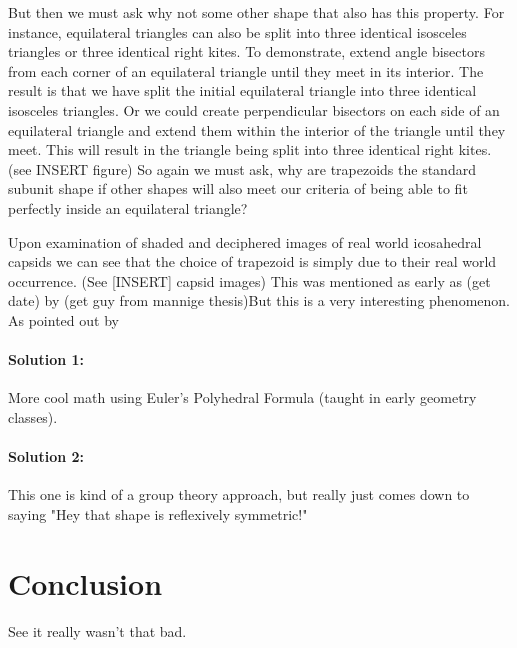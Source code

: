 \documentclass[12pt,letter]{article}
\begin{document}
But then we must ask why not some other shape that also has this property. For instance, equilateral triangles can also be split into three identical isosceles triangles or three identical right kites. To demonstrate, extend angle bisectors from each corner of an equilateral triangle until they meet in its interior. The result is that we have split the initial equilateral triangle into three identical isosceles triangles. Or we could create perpendicular bisectors on each side of an equilateral triangle and extend them within the interior of the triangle until they meet. This will result in the triangle being split into three identical right kites. (see INSERT figure) So again we must ask, why are trapezoids the standard subunit shape if other shapes will also meet our criteria of being able to fit perfectly inside an equilateral triangle?

Upon examination of shaded and deciphered images of real world icosahedral capsids we can see that the choice of trapezoid is simply due to their real world occurrence. (See [INSERT] capsid images) This was mentioned as early as (get date) by (get guy from mannige thesis)But this is a very interesting phenomenon. As pointed out by 

\paragraph{Solution 1:}

More cool math using Euler's Polyhedral Formula (taught in early geometry classes). \cite{Mannige:2008}

\paragraph{Solution 2:}
This one is kind of a group theory approach, but really just comes down to saying "Hey that shape is reflexively symmetric!" \cite{Manning:2008}

\section{Conclusion}
\paragraph{}
See it really wasn't that bad.

\newpage


\end{document}
